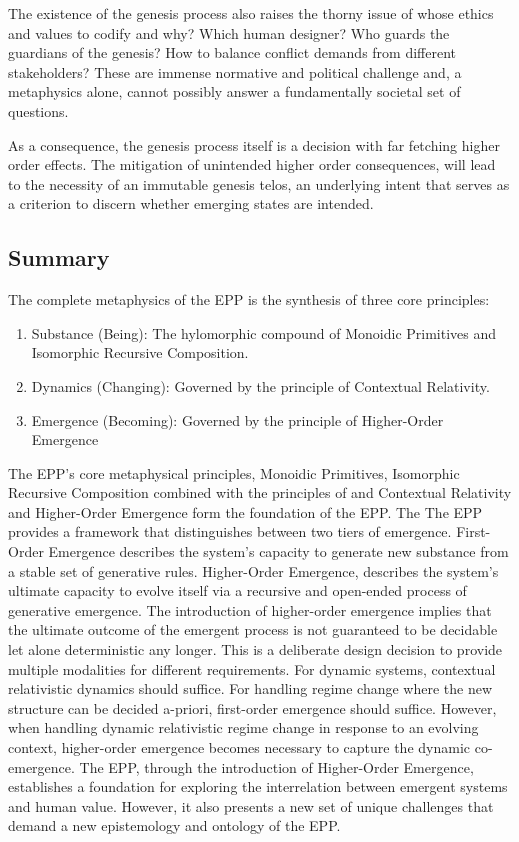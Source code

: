 The existence of the genesis process also raises the thorny issue of whose ethics and values to codify and why? Which human designer? Who guards the guardians of the genesis? How to balance conflict demands from different stakeholders? These are  immense normative and political challenge and, a metaphysics alone, cannot possibly answer a fundamentally societal set of questions. 

As a consequence, the genesis process itself is a decision with far fetching higher order effects. The mitigation of unintended higher order consequences, will lead to the necessity of an immutable genesis telos, an underlying intent that serves as a criterion to discern whether emerging states are intended. 


\subsection{Summary} 
\label{sec:metaphysics_summary}

The complete metaphysics of the EPP is the synthesis of three core principles:

\begin{enumerate}
\item Substance (Being): The hylomorphic compound of Monoidic Primitives and Isomorphic Recursive Composition.
\item Dynamics (Changing): Governed by the principle of Contextual Relativity.
\item Emergence (Becoming): Governed by the principle of Higher-Order Emergence 
\end{enumerate}


The EPP's core metaphysical principles, Monoidic Primitives, Isomorphic Recursive Composition combined with the principles of and Contextual Relativity and  Higher-Order Emergence form the foundation of the EPP. The The EPP provides a framework that distinguishes between two tiers of emergence. First-Order Emergence describes the system's capacity to generate new  substance from a stable set of generative rules. Higher-Order Emergence, describes the system's ultimate capacity to evolve itself via a recursive and open-ended process of generative emergence. The introduction of higher-order emergence implies that the ultimate outcome of the emergent process is not guaranteed to be decidable let alone deterministic any longer. This is a deliberate design decision to provide multiple modalities for different requirements. For dynamic systems, contextual relativistic dynamics should suffice. For handling regime change where the new structure can be decided a-priori, first-order emergence should suffice. However, when handling dynamic relativistic regime change in response to an evolving context, higher-order emergence becomes necessary to capture the dynamic co-emergence. The EPP, through the introduction of Higher-Order Emergence, establishes a foundation for exploring the interrelation between emergent systems and human value. However, it also presents a new set of unique challenges that demand a new epistemology and ontology of the EPP. 

\newpage